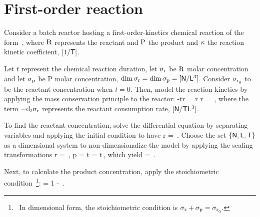 \section{First-order reaction}
Consider a batch reactor hosting a first-order-kinetics chemical reaction of the form
\beq
{}\,,
\eeq
where $\ce R$ represents the reactant and $\ce P$ the product and $\kappa$ the reaction kinetic coefficient, $[1/\mathsf{T}]$.

Let $t$ represent the chemical reaction duration, let $\conc r$ be $\ce R$ molar concentration and let $\conc p$ be \ce P molar concentration, $\dim\conc r = \dim\conc p = [\phdim N/\phdim L^3]$. Consider $\conc{r,0}$ to be the reactant concentration when $t = 0$. Then, model the reaction kinetics by applying the mass conservation principle to the reactor:
\beq
-\iod t\conc r = \krcoeff\conc r\qquad{}\qquad
 \conc r = \,,
\eeq
where the term $-\iod t\conc r$ represents the reactant consumption rate, $[\mathsf{N}/\mathsf{T}\mathsf{L}^3]$.

To find the reactant concentration, solve the differential equation by separating variables and applying the initial condition to have
\beq
\conc r = \exp{}\,.
\eeq
Choose the set $\left\lbrace{\mathsf{N}, \mathsf{L}, \mathsf{T}}\right\rbrace$ as a dimensional system to non-dimensionalize the model by applying the scaling transformations
\beq
\conc r    = \,,\qquad
\conc p    = \qquad{}\qquad
\krcoeff t = \scpq t\,,
\eeq
which yield
\beq
{} = \exp{}\,.
\eeq

Next, to calculate the product concentration, apply the stoichiometric condition~\footnote{~In dimensional form, the stoichiometric condition is $\conc r + \conc p = \conc{r,0}$.}:
\beq
{} = 1 - \,.
\eeq

